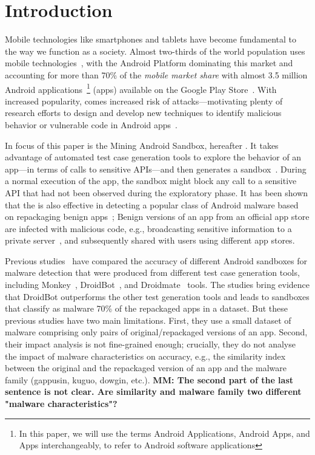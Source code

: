 \section{Introduction}\label{sec:introduction}

Mobile technologies like smartphones and tablets have become fundamental to the way we function as a society. Almost two-thirds of the world population
uses mobile technologies~\cite{Comscore,DBLP:journals/tse/MartinSJZH17}, with the
Android Platform dominating this market and accounting for more than 70\% of the \emph{mobile
market share} with almost 3.5 million Android applications~\footnote{In this paper, we will use the terms Android Applications, Android Apps, and Apps interchangeably, to refer to Android software applications} (apps)
available on the Google Play Store~\cite{Statista}. 
With increased popularity, comes increased risk of attacks---motivating plenty of research efforts to design and develop new techniques
to identify malicious behavior or vulnerable code in Android apps~\cite{10.1145/3017427}.


In focus of this paper is the Mining Android Sandbox, hereafter \mas. 
It  takes advantage of automated test case generation tools 
to explore the behavior of an app---in terms of calls to sensitive APIs---and then
generates a sandbox~\cite{DBLP:conf/icse/JamrozikSZ16}. During a normal
execution of the app, the sandbox might block any call to a sensitive API
that had not been observed during the exploratory phase. 
It has been shown that 
the \mas is also effective
in detecting a popular class of Android malware based on 
repackaging benign apps~\cite{DBLP:conf/wcre/BaoLL18,le2018towards};
Benign
versions of an app from an official app store are
infected with malicious code, e.g., broadcasting
sensitive information to a private server~\cite{DBLP:journals/tse/LiBK21}, and subsequently shared
with users using different app stores. 

Previous studies~\cite{DBLP:conf/wcre/BaoLL18,DBLP:journals/jss/CostaMMSSBNR22} 
have compared the accuracy of different Android sandboxes for malware detection 
that were produced 
from 
different test case generation tools, including Monkey~\cite{Monkey}, DroidBot~\cite{DBLP:conf/icse/LiYGC17}, and Droidmate~\cite{DBLP:conf/kbse/BorgesHZ18} tools.
The studies bring evidence that 
DroidBot outperforms the other test generation tools and leads to sandboxes that
classify as malware 70\% of the repackaged apps in a dataset.
But these previous studies have two main limitations. First, they use a small dataset of malware comprising only \appsSmall pairs of original/repackaged versions of an app. Second, their impact analysis is not fine-grained enough; crucially, they do not analyse the impact of malware characteristics on accuracy, e.g., the similarity index between the original and the repackaged version of an app and the malware family (gappusin, kuguo, dowgin, etc.). 
{\bf MM: The second part of the last sentence is not clear. Are similarity and malware family two different "malware characteristics"?}

